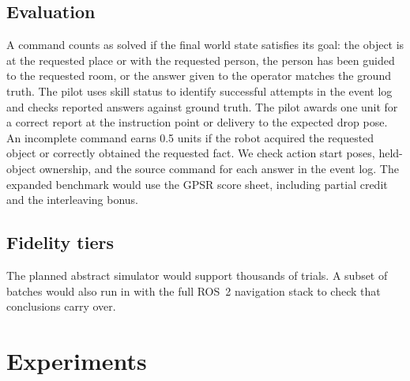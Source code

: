 \documentclass[conference]{IEEEtran}
\newcommand{\todo}[1]{}
\newcommand{\todo}[1]{\textcolor{red}{[TODO: #1]}}
\begin{document}
\subsection{Evaluation}
A command counts as solved if the final world state satisfies its goal: the
object is at the requested place or with the requested person, the person has
been guided to the requested room, or the answer given to the operator matches
the ground truth. The pilot uses skill status to identify successful
attempts in the event log and checks reported answers against ground truth.
The pilot awards one unit for a correct report at the instruction point or
delivery to the expected drop pose. An incomplete command earns 0.5 units
if the robot acquired the requested object or correctly obtained the
requested fact. We check action start poses, held-object ownership, and
the source command for each answer in the event log. The expanded
benchmark would use the GPSR score sheet, including partial credit and the
interleaving bonus.

\subsection{Fidelity tiers}
The planned abstract simulator would support thousands of trials.
\todo{Measure runtime per batch.} A subset of batches would also run in
\todo{Gazebo / Isaac Sim} with the full ROS~2 navigation stack to check
that conclusions carry over.

\section{Experiments}\label{sec:exp}
\end{document}
